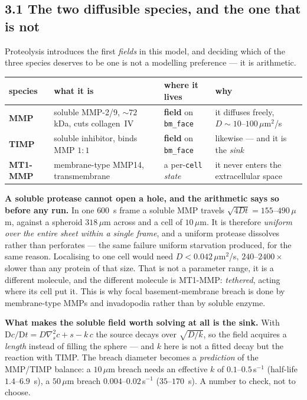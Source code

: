 \documentclass[10pt,a4paper]{article}
\newcommand{\code}[1]{\texttt{#1}}
\begin{document}
\subsection*{3.1\; The two diffusible species, and the one that is not}

Proteolysis introduces the first \emph{fields} in this model, and deciding which of the three species
deserves to be one is not a modelling preference --- it is arithmetic.

\smallskip
{\footnotesize
\begin{tabular}{@{}llll@{}}\toprule
species & what it is & where it lives & why\\\midrule
\textbf{MMP} & soluble MMP-2/9, $\sim\!72$ kDa, cuts collagen~IV &
  \textbf{field} on \code{bm\_face} & it diffuses freely, $D\sim10$--$100\,\mu$m$^2$/s\\
\textbf{TIMP} & soluble inhibitor, binds MMP $1{:}1$ &
  \textbf{field} on \code{bm\_face} & likewise --- and it is the \emph{sink}\\
\textbf{MT1-MMP} & membrane-type MMP14, transmembrane &
  a per-\code{cell} \emph{state} & it never enters the extracellular space\\
\bottomrule
\end{tabular}}
\smallskip

\textbf{A soluble protease cannot open a hole, and the arithmetic says so before any run.} In one
$600$~s frame a soluble MMP travels $\sqrt{4Dt}=155$--$490\,\mu$m, against a spheroid $318\,\mu$m
across and a cell of $10\,\mu$m. It is therefore \emph{uniform over the entire sheet within a single
frame}, and a uniform protease dissolves rather than perforates --- the same failure uniform
starvation produced, for the same reason. Localising to one cell would need
$D<0.042\,\mu$m$^2$/s, $240$--$2400\times$ slower than any protein of that size. That is not a
parameter range, it is a different molecule, and the different molecule is MT1-MMP: \emph{tethered},
acting where its cell put it. This is why focal basement-membrane breach is done by membrane-type MMPs
and invadopodia rather than by soluble enzyme.

\textbf{What makes the soluble field worth solving at all is the sink.} With
$\mathrm Dc/\mathrm Dt = D\nabla_s^2c + s - k\,c$ the source decays over $\sqrt{D/k}$, so the field
acquires a \emph{length} instead of filling the sphere --- and $k$ here is not a fitted decay but the
reaction with TIMP. The breach diameter becomes a \emph{prediction} of the MMP/TIMP balance: a
$10\,\mu$m breach needs an effective $k$ of $0.1$--$0.5\,$s$^{-1}$ (half-life $1.4$--$6.9$~s), a
$50\,\mu$m breach $0.004$--$0.02\,$s$^{-1}$ ($35$--$170$~s). A number to check, not to choose.
\end{document}
